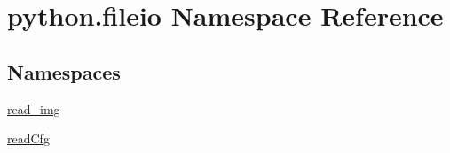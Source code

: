 \hypertarget{namespacepython_1_1fileio}{\section{python.\-fileio Namespace Reference}
\label{namespacepython_1_1fileio}
}
\subsection*{Namespaces}
\begin{DoxyCompactItemize}
\item 
\hyperlink{namespacepython_1_1fileio_1_1read__img}{read\-\_\-img}
\item 
\hyperlink{namespacepython_1_1fileio_1_1read_cfg}{read\-Cfg}
\end{DoxyCompactItemize}
